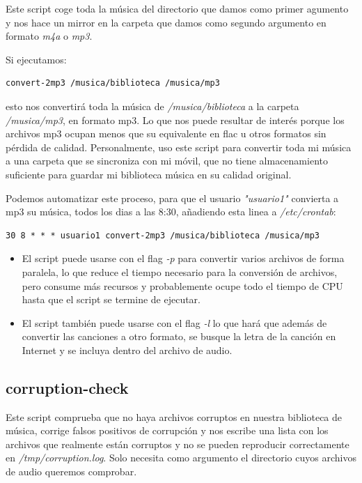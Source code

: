 \documentclass[12pt]{article}
\begin{document}
Este script coge toda la música del directorio que damos como primer agumento y nos hace un mirror en la carpeta que damos como segundo argumento en formato \emph{m4a} o \emph{mp3}.

Si ejecutamos:
\begin{verbatim}
convert-2mp3 /musica/biblioteca /musica/mp3
\end{verbatim}

esto nos convertirá toda la música de \emph{/musica/biblioteca} a la carpeta \emph{/musica/mp3}, en formato mp3. Lo que nos puede resultar de interés porque los archivos mp3 ocupan menos que su equivalente en flac u otros formatos sin pérdida de calidad. Personalmente, uso este script para convertir toda mi música a una carpeta que se sincroniza con mi móvil, que no tiene almacenamiento suficiente para guardar mi biblioteca música en su calidad original.

Podemos automatizar este proceso, para que el usuario \emph{"usuario1"} convierta a mp3 su música, todos los dias a las 8:30, añadiendo esta linea a \emph{/etc/crontab}:

\begin{verbatim}
30 8 * * * usuario1 convert-2mp3 /musica/biblioteca /musica/mp3
\end{verbatim}

\begin{itemize}
\item El script puede usarse con el flag \emph{-p} para convertir varios archivos de forma paralela, lo que reduce el tiempo necesario para la conversión de archivos, pero consume más recursos y probablemente ocupe todo el tiempo de CPU hasta que el script se termine de ejecutar.
\item El script también puede usarse con el flag \emph{-l} lo que hará que además de convertir las canciones a otro formato, se busque la letra de la canción en Internet y se incluya dentro del archivo de audio.
\end{itemize}

\subsection{corruption-check}

Este script comprueba que no haya archivos corruptos en nuestra biblioteca de música, corrige falsos positivos de corrupción y nos escribe una lista con los archivos que realmente están corruptos y no se pueden reproducir correctamente en \emph{/tmp/corruption.log}. Solo necesita como argumento el directorio cuyos archivos de audio queremos comprobar.
\end{document}
